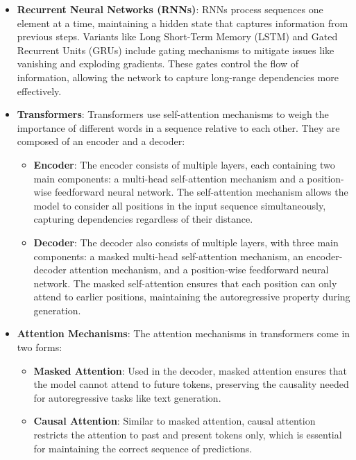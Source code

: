 \begin{itemize}
    \item \textbf{Recurrent Neural Networks (RNNs)}: RNNs process sequences one element at a time, maintaining a hidden state that captures information from previous steps. Variants like Long Short-Term Memory (LSTM) and Gated Recurrent Units (GRUs) include gating mechanisms to mitigate issues like vanishing and exploding gradients. These gates control the flow of information, allowing the network to capture long-range dependencies more effectively.

    \item \textbf{Transformers}: Transformers use self-attention mechanisms to weigh the importance of different words in a sequence relative to each other. They are composed of an encoder and a decoder:

    \begin{itemize}
        \item \textbf{Encoder}: The encoder consists of multiple layers, each containing two main components: a multi-head self-attention mechanism and a position-wise feedforward neural network. The self-attention mechanism allows the model to consider all positions in the input sequence simultaneously, capturing dependencies regardless of their distance.
        
        \item \textbf{Decoder}: The decoder also consists of multiple layers, with three main components: a masked multi-head self-attention mechanism, an encoder-decoder attention mechanism, and a position-wise feedforward neural network. The masked self-attention ensures that each position can only attend to earlier positions, maintaining the autoregressive property during generation.
    \end{itemize}

    \item \textbf{Attention Mechanisms}: The attention mechanisms in transformers come in two forms:
    \begin{itemize}
        \item \textbf{Masked Attention}: Used in the decoder, masked attention ensures that the model cannot attend to future tokens, preserving the causality needed for autoregressive tasks like text generation.
        
        \item \textbf{Causal Attention}: Similar to masked attention, causal attention restricts the attention to past and present tokens only, which is essential for maintaining the correct sequence of predictions.
        

\end{itemize}
\end{itemize}
